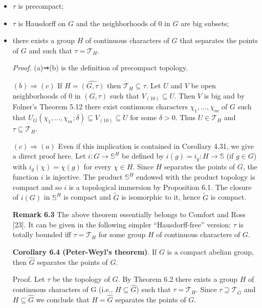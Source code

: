 \documentclass[12pt]{article}
\begin{document}
    \begin{itemize}

        \item $\tau$ is precompact;

        \item $\tau$ is Hausdorff on $G$ and the neighborhoods of 0 in $G$ are big subsets;

        \item there exists a group $H$ of continuous characters of $G$ that separates the points of $G$ and such that $\tau = \mathcal{T}_H$.

    \begin{itemize}


    \emph{Proof.} (a)⇒(b) is the definition of precompact topology.
    
    
        $(b)\Rightarrow(c)$ If $H = \hat{(G, \tau )}$ then $\mathcal{T}_H \subseteq \tau$. Let $U$ and $V$ be open neighborhoods of 0 in $(G, \tau )$ such that $V_{(10)} \subseteq U$.
    Then $V$ is big and by Folner's Theorem 5.12 there exist continuous characters $\chi_1, . . . , \chi_m$ of $G$ such that
    $U_G(\chi_1, . . . , \chi_m; \delta) \subseteq V_{(10)} \subseteq U$ for some $\delta > 0$. Thus $U \in \mathcal{T}_H$ and $\tau \subseteq \mathcal{T}_H$.
    
    
        $(c)\Rightarrow(a)$ Even if this implication is contained in Corollary 4.31, we give a direct proof here. Let $i : G \to \mathbb{S}^H$
    be defined by $i(g) = i_g : H \to \mathbb{S}$ (if $g \in G$) with $i_g (\chi) = \chi (g)$ for every $\chi \in H$. Since $H$ separates the points
    of $G$, the function $i$ is injective. The product $\mathbb{S}^H$ endowed with the product topology is compact and so $i$ is
    a topological immersion by Proposition 6.1. The closure of $i(G)$ in $\mathbb{S}^H$ is compact and $\tilde{G}$ is isomorphic to it,
    hence $\tilde{G}$ is compact.


\textbf{Remark 6.3} The above theorem essentially belongs to Comfort and Ross [23]. It can be given in the following
simpler “Hausdorff-free” version: $\tau$ is totally bounded iff $\tau = \mathcal{T}_H$ for some group $H$ of continuous characters of
$G$.


\textbf{Corollary 6.4 (Peter-Weyl's theorem)}. If $G$ is a compact abelian group, then $\hat{G}$ separates the points of $G$.


    Proof. Let $\tau$ be the topology of $G$. By Theorem 6.2 there exists a group $H$ of continuous characters of G (i.e.,
$H \subseteq \hat{G}$) such that $\tau = \mathcal{T}_H$. Since $\tau \supseteq \mathcal{T}_{\bar{G}}$ and $H \subseteq \hat{G}$ we conclude that $H = \hat{G}$ separates the points of $G$.



\end{itemize}
\end{itemize}
\end{document}
